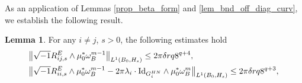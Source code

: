 \documentclass[12pt]{article}
\numberwithin{equation}{section}
\theoremstyle{theorem}
\theoremstyle{definition}
\newtheorem{lem}[thm]{Lemma}
\theoremstyle{remark}
\newcommand{\imun} {\sqrt{-1}}
\begin{document}
	As an application of Lemmas \ref{prop_beta_form} and \ref{lem_bnd_off_diag_curv}, we establish the following result.
	\begin{lem}\label{lem_bnd_curv_offdi}
		For any $i \neq j$, $s > 0$, the following estimates hold 
		\begin{equation}\label{eq_bnd_curv_offdi}
		\begin{aligned}
			&
			\big\| 
			\imun R^E_{i j, s} \wedge \mu_0^* \omega_B^{m - 1} 
			\big\|_{L^1(B_0, H_s)}
			\leq
			2 \pi \delta r q 8^{q + 4},
			\\
			&
			\big\| 
			\imun R^E_{i i, s} \wedge \mu_0^* \omega_B^{m - 1} 
			-
			2 \pi \lambda_i \cdot {\rm{Id}}_{G_i^{HN}} \wedge \mu_0^* \omega_B^m
			\big\|_{L^1(B_0, H_s)}
			\leq
			2 \pi \delta r q 8^{q + 3},
		\end{aligned}
		\end{equation}
	\end{lem}
\end{document}
